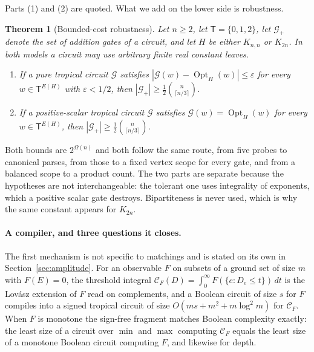 \documentclass[11pt]{article}
\newtheorem{theorem}{Theorem}[section]
\newcommand{\Opt}{\operatorname{Opt}}
\begin{document}
Parts (1) and (2) are quoted.  What we add on the lower side is robustness.

\begin{theorem}[Bounded-cost robustness]
\label{thm:robust}
Let $n\ge2$, let $\mathsf T=\{0,1,2\}$, let $\mathcal G_+$ denote the set of
addition gates of a circuit, and let $H$ be either $K_{n,n}$ or $K_{2n}$.  In
both models a circuit may use arbitrary finite real constant leaves.
\begin{enumerate}
  \item If a pure tropical circuit $\mathcal G$ satisfies
        $|\mathcal G(w)-\Opt_H(w)|\le\varepsilon$ for every $w\in\mathsf T^{E(H)}$
        with $\varepsilon<1/2$, then
        $|\mathcal G_+|\ge\tfrac12\binom{n}{\lceil n/3\rceil}$.
  \item If a positive-scalar tropical circuit $\mathcal G$ satisfies
        $\mathcal G(w)=\Opt_H(w)$ for every $w\in\mathsf T^{E(H)}$, then
        $|\mathcal G_+|\ge\tfrac12\binom{n}{\lceil n/3\rceil}$.
\end{enumerate}
\end{theorem}

Both bounds are $2^{\Omega(n)}$ and both follow the same route, from five probes
to canonical parses, from those to a fixed vertex scope for every gate, and from
a balanced scope to a product count.  The two parts are separate because the
hypotheses are not interchangeable: the tolerant one uses integrality of
exponents, which a positive scalar gate destroys.  Bipartiteness is never used,
which is why the same constant appears for $K_{2n}$.

\paragraph{A compiler, and three questions it closes.}
The first mechanism is not specific to matchings and is stated on its own in
Section~\ref{sec:amplitude}.  For an observable $F$ on subsets of a ground set
of size $m$ with $F(E)=0$, the threshold integral
$\mathcal C_F(D)=\int_0^{\infty}F(\{e:D_e\le t\})\,dt$ is the Lov\'asz extension
of $F$ read on complements, and a Boolean circuit of size $s$ for $F$ compiles
into a signed tropical circuit of size $O(ms+m^{2}+m\log^{2}m)$ for
$\mathcal C_F$.  When $F$ is monotone the sign-free fragment matches Boolean
complexity exactly: the least size of a circuit over $\min$ and $\max$ computing
$\mathcal C_F$ equals the least size of a monotone Boolean circuit computing $F$,
and likewise for depth.
\end{document}
